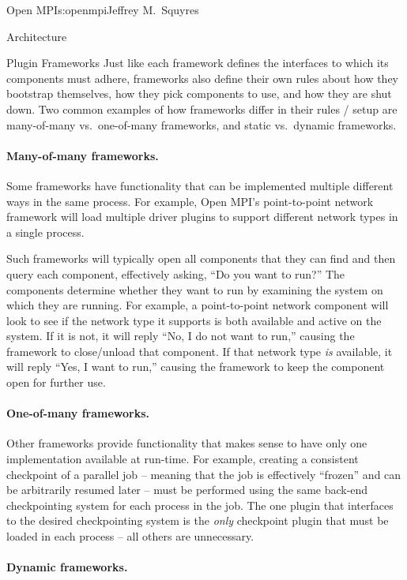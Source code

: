 \begin{aosachapter}{Open MPI}{s:openmpi}{Jeffrey M.\ Squyres}
\begin{aosasect1}{Architecture}
\begin{aosasect2}{Plugin Frameworks}
Just like each framework defines the interfaces to which its
components must adhere, frameworks also define their own rules about
how they bootstrap themselves, how they pick components to use, and
how they are shut down.  Two common examples of how frameworks differ
in their rules / setup are many-of-many vs.\ one-of-many frameworks,
and static vs.\ dynamic frameworks.


\paragraph{Many-of-many frameworks.} 

Some frameworks have functionality that can be implemented multiple
different ways in the same process.
%
For example, Open MPI's point-to-point network framework will load
multiple driver plugins to support different network types in a single
process.

Such frameworks will typically open all components that they can find
and then query each component, effectively asking, ``Do you want to
run?''  
%
The components determine whether they want to run by examining the
system on which they are running.
%
For example, a point-to-point network component will look to see if
the network type it supports is both available and active on the
system.
%
If it is not, it will reply ``No, I do not want to run,'' causing the
framework to close/unload that component.
% 
If that network type {\em is} available, it will reply ``Yes, I want to
run,'' causing the framework to keep the component open for further
use.


\paragraph{One-of-many frameworks.} 

Other frameworks provide functionality that makes sense to have only
one implementation available at run-time.
%
For example, creating a consistent checkpoint of a parallel job --
meaning that the job is effectively ``frozen'' and can be arbitrarily
resumed later -- must be performed using the same back-end
checkpointing system for each process in the job.
%
The one plugin that interfaces to the desired checkpointing system is
the {\em only} checkpoint plugin that must be loaded in each process
-- all others are unnecessary.


\paragraph{Dynamic frameworks.} 


\end{aosasect2}
\end{aosasect1}
\end{aosachapter}
